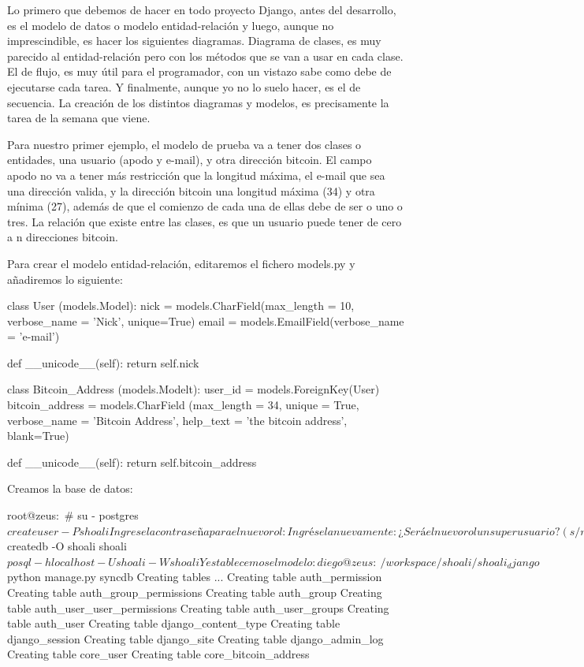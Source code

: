 \documentclass[a4paper, 12pt]{book}
\begin{document}
Lo primero que debemos de hacer en todo proyecto Django, antes del desarrollo, es el modelo de datos o modelo entidad-relación y luego, aunque no imprescindible, es hacer los siguientes diagramas. Diagrama de clases, es muy parecido al entidad-relación pero con los métodos que se van a usar en cada clase. El de flujo, es muy útil para el programador, con un vistazo sabe como debe de  ejecutarse cada tarea. Y finalmente, aunque yo no lo suelo hacer, es el de secuencia. La creación de los distintos diagramas y modelos, es precisamente la tarea de la semana que viene.

Para nuestro primer ejemplo, el modelo de prueba va a tener dos clases o entidades, una usuario (apodo y e-mail), y otra dirección bitcoin. El campo apodo no va a tener más restricción que la longitud máxima, el e-mail que sea una dirección valida, y la dirección bitcoin una longitud máxima  (34) y otra mínima (27), además de que el comienzo de cada una de ellas debe de ser o uno o tres. La relación que existe entre las clases, es que un usuario puede tener de cero a n direcciones bitcoin.

Para crear el modelo entidad-relación, editaremos el fichero models.py y añadiremos lo siguiente:

class User (models.Model):
    nick = models.CharField(max_length = 10, verbose_name = 'Nick', unique=True)
    email = models.EmailField(verbose_name = 'e-mail')
 
    def __unicode__(self):
        return self.nick
 
class Bitcoin_Address (models.Modelt):
    user_id = models.ForeignKey(User)
    bitcoin_address = models.CharField (max_length = 34, unique = True,
            verbose_name = 'Bitcoin Address',
            help_text = 'the bitcoin address', blank=True)
 
    def __unicode__(self):
        return self.bitcoin_address

Creamos la base de datos:

root@zeus:~# su - postgres
$ createuser -P shoali
  Ingrese la contraseña para el nuevo rol:
  Ingrésela nuevamente:
  ¿Será el nuevo rol un superusuario? (s/n) n
  ¿Debe permitírsele al rol la creación de bases de datos? (s/n) n
  ¿Debe permitírsele al rol la creación de otros roles? (s/n) n
$ createdb -O shoali shoali
$ posql -h localhost -U shoali -W shoali

Y establecemos el modelo:

diego@zeus:~/workspace/shoali/shoali_django$ python manage.py syncdb
Creating tables ...
Creating table auth_permission
Creating table auth_group_permissions
Creating table auth_group
Creating table auth_user_user_permissions
Creating table auth_user_groups
Creating table auth_user
Creating table django_content_type
Creating table django_session
Creating table django_site
Creating table django_admin_log
Creating table core_user
Creating table core_bitcoin_address
 
\end{document}
